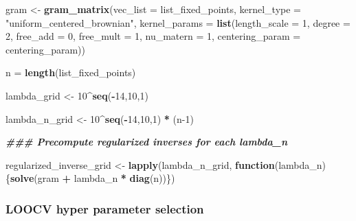 \documentclass[
]{article}
\newenvironment{Shaded}{\begin{snugshade}}{\end{snugshade}}
\newcommand{\AttributeTok}[1]{\textcolor[rgb]{0.13,0.29,0.53}{#1}}
\newcommand{\ControlFlowTok}[1]{\textcolor[rgb]{0.13,0.29,0.53}{\textbf{#1}}}
\newcommand{\DecValTok}[1]{\textcolor[rgb]{0.00,0.00,0.81}{#1}}
\newcommand{\DocumentationTok}[1]{\textcolor[rgb]{0.56,0.35,0.01}{\textbf{\textit{#1}}}}
\newcommand{\FunctionTok}[1]{\textcolor[rgb]{0.13,0.29,0.53}{\textbf{#1}}}
\newcommand{\NormalTok}[1]{#1}
\newcommand{\OtherTok}[1]{\textcolor[rgb]{0.56,0.35,0.01}{#1}}
\newcommand{\SpecialCharTok}[1]{\textcolor[rgb]{0.81,0.36,0.00}{\textbf{#1}}}
\newcommand{\StringTok}[1]{\textcolor[rgb]{0.31,0.60,0.02}{#1}}
\begin{document}
\begin{Shaded}
\begin{Highlighting}[]
\NormalTok{gram }\OtherTok{\textless{}{-}} \FunctionTok{gram\_matrix}\NormalTok{(}\AttributeTok{vec\_list =}\NormalTok{ list\_fixed\_points, }
                    \AttributeTok{kernel\_type =} \StringTok{"uniform\_centered\_brownian"}\NormalTok{,}
                    \AttributeTok{kernel\_params =} \FunctionTok{list}\NormalTok{(}\AttributeTok{length\_scale =} \DecValTok{1}\NormalTok{, }\AttributeTok{degree =} \DecValTok{2}\NormalTok{,}
                                             \AttributeTok{free\_add =} \DecValTok{0}\NormalTok{, }\AttributeTok{free\_mult =} \DecValTok{1}\NormalTok{,}
                                             \AttributeTok{nu\_matern =} \DecValTok{1}\NormalTok{, }
                                         \AttributeTok{centering\_param =}\NormalTok{ centering\_param))}

\NormalTok{n }\OtherTok{=} \FunctionTok{length}\NormalTok{(list\_fixed\_points)}

\NormalTok{lambda\_grid }\OtherTok{\textless{}{-}} \DecValTok{10}\SpecialCharTok{\^{}}\FunctionTok{seq}\NormalTok{(}\SpecialCharTok{{-}}\DecValTok{14}\NormalTok{,}\DecValTok{10}\NormalTok{,}\DecValTok{1}\NormalTok{)}

\NormalTok{lambda\_n\_grid }\OtherTok{\textless{}{-}} \DecValTok{10}\SpecialCharTok{\^{}}\FunctionTok{seq}\NormalTok{(}\SpecialCharTok{{-}}\DecValTok{14}\NormalTok{,}\DecValTok{10}\NormalTok{,}\DecValTok{1}\NormalTok{) }\SpecialCharTok{*}\NormalTok{ (n}\DecValTok{{-}1}\NormalTok{)}

\DocumentationTok{\#\#\# Precompute regularized inverses for each lambda\_n}

\NormalTok{regularized\_inverse\_grid }\OtherTok{\textless{}{-}} \FunctionTok{lapply}\NormalTok{(lambda\_n\_grid, }\ControlFlowTok{function}\NormalTok{(lambda\_n)\{}\FunctionTok{solve}\NormalTok{(gram }\SpecialCharTok{+}\NormalTok{ lambda\_n }\SpecialCharTok{*} \FunctionTok{diag}\NormalTok{(n))\})}
\end{Highlighting}
\end{Shaded}

\subsubsection{LOOCV hyper parameter
selection}\label{loocv-hyper-parameter-selection}
\end{document}
